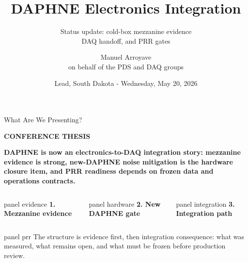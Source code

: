 \documentclass[aspectratio=169,10pt]{beamer}
\title[DAPHNE Electronics Integration]{DAPHNE Electronics Integration}
\subtitle{Status update: cold-box mezzanine evidence\\DAQ handoff, and PRR gates}
\author[Manuel Arroyave]{\texorpdfstring{Manuel Arroyave\\{\small on behalf of the PDS and DAQ groups}}{Manuel Arroyave on behalf of the PDS and DAQ groups}}
\date{Lead, South Dakota - Wednesday, May 20, 2026}
\newcommand{\eyebrow}[1]{{\color{noircyan}\small\bfseries #1\par}}
\newcommand{\microcontentdrop}{\vspace*{1mm}}
\begin{document}
\begin{frame}
  \titlepage
\end{frame}

\begin{frame}[t]{What Are We Presenting?}
\microcontentdrop
\eyebrow{CONFERENCE THESIS}
{\color{white}\bfseries\fontsize{13.4}{15.8}\selectfont
DAPHNE is now an electronics-to-DAQ integration story: mezzanine evidence is strong, new-DAPHNE noise mitigation is the hardware closure item, and PRR readiness depends on frozen data and operations contracts.\par}

\vspace{3mm}
\begin{columns}[T,onlytextwidth]
\begin{beamercolorbox}[wd=\linewidth,sep=5pt,rounded=true]{panel evidence}
\centering\bfseries 1. Mezzanine evidence
\end{beamercolorbox}
\begin{beamercolorbox}[wd=\linewidth,sep=5pt,rounded=true]{panel hardware}
\centering\bfseries 2. New DAPHNE gate
\end{beamercolorbox}
\begin{beamercolorbox}[wd=\linewidth,sep=5pt,rounded=true]{panel integration}
\centering\bfseries 3. Integration path
\end{beamercolorbox}
\end{columns}

\vspace{3mm}
\begin{beamercolorbox}[wd=\linewidth,sep=4pt,rounded=true]{panel prr}
\centering
\scriptsize
The structure is evidence first, then integration consequence: what was measured, what remains open, and what must be frozen before production review.
\end{beamercolorbox}
\end{frame}
\end{document}

